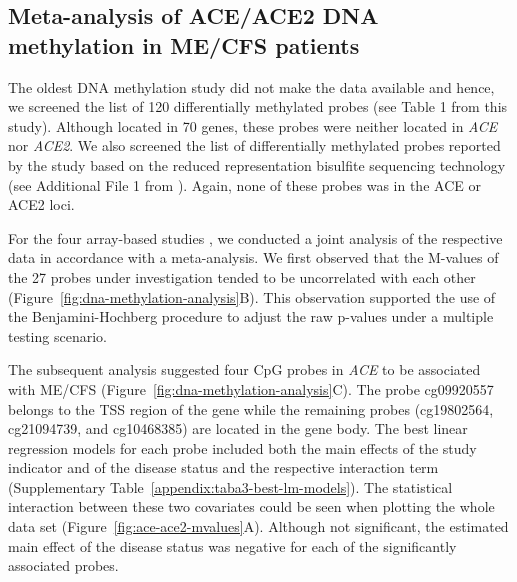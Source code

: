 \subsection{Meta-analysis of ACE/ACE2 DNA methylation in ME/CFS patients}

The oldest DNA methylation study \citep{brenu2014MethylationProfile} did not make the data available and hence, we screened the list of 120 differentially methylated probes (see Table 1 from this study). Although located in 70 genes, these probes were neither located in \textit{ACE} nor \textit{ACE2}. We also screened the list of differentially methylated probes reported by the study based on the reduced representation bisulfite sequencing technology (see Additional File 1 from \citet{helliwell2020ChangesDNA}). Again, none of these probes was in the ACE or ACE2 loci.

For the four array-based studies \citep{vegaDNAMethylationModifications2014, vegaEpigeneticModificationsGlucocorticoid2017, trivedi2018IdentificationMyalgic, herrera2018GenomeepigenomeInteractions}, we conducted a joint analysis of the respective data in accordance with a meta-analysis. We first observed that the M-values of the 27 probes under investigation tended to be uncorrelated with each other (Figure~\ref{fig:dna-methylation-analysis}B). This observation supported the use of the Benjamini-Hochberg procedure to adjust the raw p-values under a multiple testing scenario.

The subsequent analysis suggested four CpG probes in \textit{ACE} to be associated with ME/CFS (Figure~\ref{fig:dna-methylation-analysis}C). The probe cg09920557 belongs to the TSS region of the gene while the remaining probes (cg19802564, cg21094739, and cg10468385) are located in the gene body. The best linear regression models for each probe included both the main effects of the study indicator and of the disease status and the respective interaction term (Supplementary Table~\ref{appendix:taba3-best-lm-models}). The statistical interaction between these two covariates could be seen when plotting the whole data set (Figure~\ref{fig:ace-ace2-mvalues}A). Although not significant, the estimated main effect of the disease status was negative for each of the significantly associated probes.

